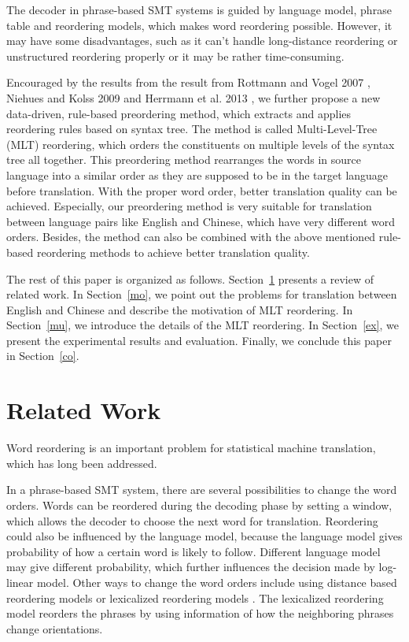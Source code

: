 \documentclass[a4paper]{article}
\begin{document}
The decoder in phrase-based SMT systems is guided by language model, phrase table and reordering models, which makes word reordering possible. However, it may have some disadvantages, such as it can't handle long-distance reordering or unstructured reordering properly or it may be rather time-consuming.

Encouraged by the results from the result from Rottmann and Vogel 2007 \cite{short}, Niehues and Kolss 2009 \cite{long} and Herr\-mann et al. 2013 \cite{tree}, we further propose a new data-driven, rule-based preordering method, which extracts and applies reordering rules based on syntax tree. The method is called Multi-Level-Tree (MLT) reordering, which orders the constituents on multiple levels of the syntax tree all together. This preordering method rearranges the words in source language into a similar order as they are supposed to be in the target language before translation. With the proper word order, better translation quality can be achieved. Especially, our preordering method is very suitable for translation between language pairs like English and Chinese, which have very different word orders. Besides, the method can also be combined with the above mentioned rule-based reordering methods to achieve better translation quality. 

The rest of this paper is organized as follows. Section~\ref{re} presents a review of related work. In Section~\ref{mo}, we point out the problems for translation between English and Chinese and describe the motivation of MLT reordering. In Section~\ref{mu}, we introduce the details of the MLT reordering. In Section~\ref{ex}, we present the experimental results and evaluation. Finally, we conclude this paper in Section~\ref{co}.

\section{Related Work}
\label{re}

Word reordering is an important problem for statistical machine translation, which has long been addressed.

In a phrase-based SMT system, there are several possibilities to change the word orders. Words can be reordered during the decoding phase by setting a window, which allows the decoder to choose the next word for translation. Reordering could also be influenced by the language model, because the language model gives probability of how a certain word is likely to follow. Different language model may give different probability, which further influences the decision made by log-linear model. Other ways to change the word orders include using distance based reordering models or lexicalized reordering models \cite{tillmann2004, koehn2005}. The lexicalized reordering model reorders the phrases by using information of how the neighboring phrases change orientations.
\end{document}

